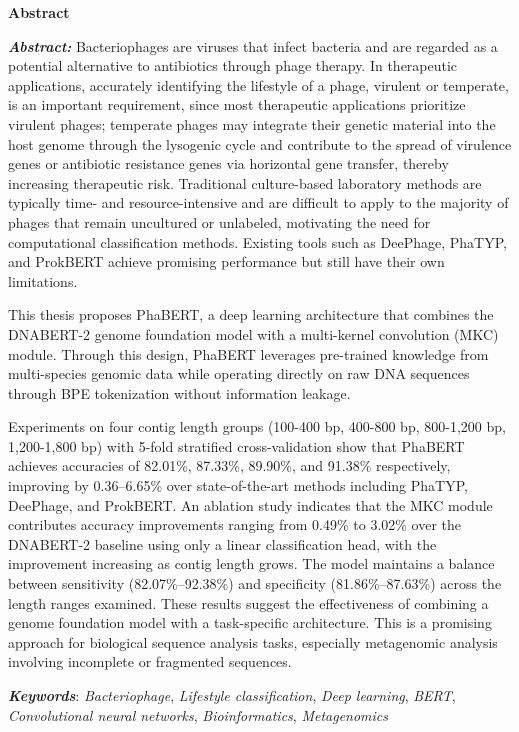 \begin{center}
\textbf{\large{Abstract}	}
\end{center}

\begin{small}

\textbf{\textit{Abstract: }}Bacteriophages are viruses that infect bacteria and are regarded as a potential alternative to antibiotics through phage therapy. In therapeutic applications, accurately identifying the lifestyle of a phage, virulent or temperate, is an important requirement, since most therapeutic applications prioritize virulent phages; temperate phages may integrate their genetic material into the host genome through the lysogenic cycle and contribute to the spread of virulence genes or antibiotic resistance genes via horizontal gene transfer, thereby increasing therapeutic risk. Traditional culture-based laboratory methods are typically time- and resource-intensive and are difficult to apply to the majority of phages that remain uncultured or unlabeled, motivating the need for computational classification methods. Existing tools such as DeePhage, PhaTYP, and ProkBERT achieve promising performance but still have their own limitations.

This thesis proposes PhaBERT, a deep learning architecture that combines the DNABERT-2 genome foundation model with a multi-kernel convolution (MKC) module. Through this design, PhaBERT leverages pre-trained knowledge from multi-species genomic data while operating directly on raw DNA sequences through BPE tokenization without information leakage.

Experiments on four contig length groups (100-400 bp, 400-800 bp, 800-1,200 bp, 1,200-1,800 bp) with 5-fold stratified cross-validation show that PhaBERT achieves accuracies of 82.01\%, 87.33\%, 89.90\%, and 91.38\% respectively, improving by 0.36--6.65\% over state-of-the-art methods including PhaTYP, DeePhage, and ProkBERT. An ablation study indicates that the MKC module contributes accuracy improvements ranging from 0.49\% to 3.02\% over the DNABERT-2 baseline using only a linear classification head, with the improvement increasing as contig length grows. The model maintains a balance between sensitivity (82.07\%--92.38\%) and specificity (81.86\%--87.63\%) across the length ranges examined. These results suggest the effectiveness of combining a genome foundation model with a task-specific architecture. This is a promising approach for biological sequence analysis tasks, especially metagenomic analysis involving incomplete or fragmented sequences.

\vspace*{1cm}
\textbf{\textit{Keywords}}: \textit{Bacteriophage}, \textit{Lifestyle classification}, \textit{Deep learning}, \textit{BERT}, \textit{Convolutional neural networks}, \textit{Bioinformatics}, \textit{Metagenomics}
\end{small}
